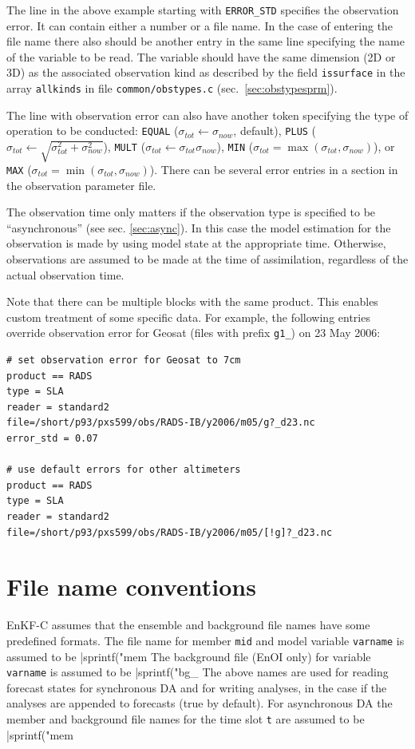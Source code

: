 \documentclass[11pt]{report}
\begin{document}
The line in the above example starting with \verb|ERROR_STD| specifies the observation error.
It can contain either a number or a file name.
In the case of entering the file name there also should be another entry in the same line specifying the name of the variable to be read.
The variable should have the same dimension (2D or 3D) as the associated observation kind as described by the field \verb|issurface| in the array \verb|allkinds| in file \verb|common/obstypes.c| (sec.~\ref{sec:obstypesprm}).

The line with observation error can also have another token specifying the type of operation to be conducted: \verb|EQUAL| ($\sigma_{tot} \leftarrow \sigma_{now}$, default), \verb|PLUS| ($\sigma_{tot} \leftarrow \sqrt{\sigma_{tot}^2 + \sigma_{now}^2}$), \verb|MULT| ($\sigma_{tot} \leftarrow \sigma_{tot} \sigma_{now}$), \verb|MIN| ($\sigma_{tot} = \max(\sigma_{tot}, \sigma_{now})$), or \verb|MAX| ($\sigma_{tot} = \min(\sigma_{tot}, \sigma_{now})$).
There can be several error entries in a section in the observation parameter file.

The observation time only matters if the observation type is specified to be ``asynchronous'' (see sec. \ref{sec:async}).
In this case the model estimation for the observation is made by using model state at the appropriate time.
Otherwise, observations are assumed to be made at the time of assimilation, regardless of the actual observation time.

Note that there can be multiple blocks with the same product.
This enables custom treatment of some specific data.
For example, the following entries override observation error for Geosat (files with prefix \verb|g1_|) on 23 May 2006:
\begin{Verbatim}[frame=single,fontsize=\footnotesize]
# set observation error for Geosat to 7cm
product == RADS
type = SLA
reader = standard2
file=/short/p93/pxs599/obs/RADS-IB/y2006/m05/g?_d23.nc
error_std = 0.07

# use default errors for other altimeters
product == RADS
type = SLA
reader = standard2
file=/short/p93/pxs599/obs/RADS-IB/y2006/m05/[!g]?_d23.nc
\end{Verbatim}

\section{File name conventions}
\label{sec:filenames}

EnKF-C assumes that the ensemble and background file names have some predefined formats.
The file name for member \verb|mid| and model variable \verb|varname| is assumed to be \spverb|sprintf("mem%
The background file (EnOI only) for variable \verb|varname| is assumed to be \spverb|sprintf("bg_%
The above names are used for reading forecast states for synchronous DA and for writing analyses, in the case if the analyses are appended to forecasts (true by default).
For asynchronous DA the member and background file names for the time slot \verb|t| are assumed to be \spverb|sprintf("mem%
\end{document}
